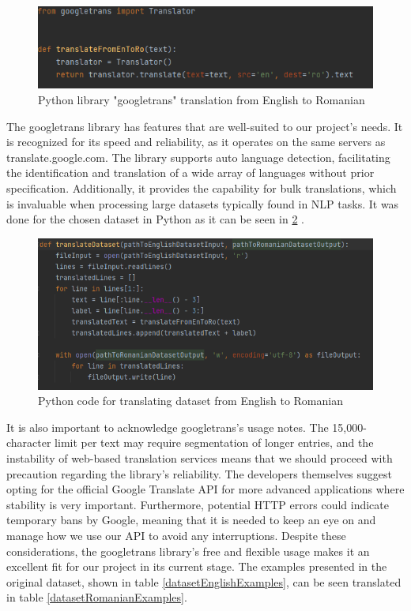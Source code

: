 \begin{figure}[htbp]
	\centering
		\includegraphics[scale=1]{LaTeX Bachelor Thesis Depression Signs Detection/figures/codeGoogleTransUsage.png}
	\caption{Python library "googletrans" translation from English to Romanian}
	\label{codeGoogleTransUsage}
\end{figure}

The googletrans library \cite{googletranslib} has features that are well-suited to our project's needs. It is recognized for its speed and reliability, as it operates on the same servers as translate.google.com. The library supports auto language detection, facilitating the identification and translation of a wide array of languages without prior specification. Additionally, it provides the capability for bulk translations, which is invaluable when processing large datasets typically found in NLP tasks. It was done for the chosen dataset \cite{depressionDataset} in Python as it can be seen in \ref{codeDatasetTranslation} .

\begin{figure}[htbp]
	\centering
		\includegraphics[scale=1]{LaTeX Bachelor Thesis Depression Signs Detection/figures/codeDatasetTranslation.png}
	\caption{Python code for translating dataset from English to Romanian}
	\label{codeDatasetTranslation}
\end{figure}

It is also important to acknowledge googletrans's \cite{googletranslib} usage notes. The 15,000-character limit per text may require segmentation of longer entries, and the instability of web-based translation services means that we should proceed with precaution regarding the library's reliability. The developers themselves suggest opting for the official Google Translate API for more advanced applications where stability is very important. Furthermore, potential HTTP errors could indicate temporary bans by Google, meaning that it is needed to keep an eye on and manage how we use our API to avoid any interruptions. Despite these considerations, the googletrans library's free and flexible usage makes it an excellent fit for our project in its current stage. The examples presented in the original dataset, shown in table \ref{datasetEnglishExamples}, can be seen translated in table \ref{datasetRomanianExamples}.

